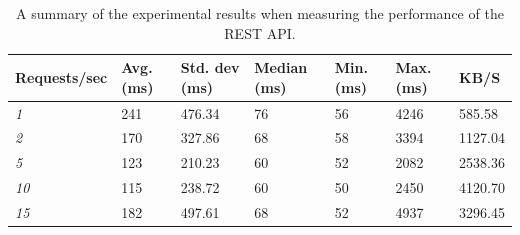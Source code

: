 \begin{table}[]
	\centering
	\begin{tabular}{|l|l|l|l|l|l|l|}
		\hline
		\textbf{Requests/sec} & \textbf{Avg. (ms)} & \textbf{Std. dev (ms)} & \textbf{Median (ms)} & \textbf{Min. (ms)} & \textbf{Max. (ms)} & \textbf{KB/S} \\ \hline
		\emph{1} & 241 & 476.34 & 76 & 56 & 4246 & 585.58\\ \hline
		\emph{2} & 170 & 327.86 & 68 & 58 & 3394 & 1127.04\\ \hline
		\emph{5} & 123 & 210.23 & 60 & 52 & 2082 & 2538.36\\ \hline
		\emph{10} & 115 & 238.72 & 60 & 50 & 2450 & 4120.70\\ \hline
		\emph{15} & 182 & 497.61 & 68 & 52 & 4937 & 3296.45\\ \hline
	\end{tabular}
	\caption{A summary of the experimental results when measuring the performance of the REST API.}
	\label{table:performance-api-results}
\end{table}

